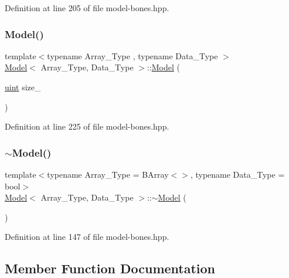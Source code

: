 Definition at line 205 of file model-\/bones.\+hpp.

\mbox{\label{class_model_a841a883c666ecd9b07385bfb36078bc5}} 
\subsubsection{\texorpdfstring{Model()}{Model()}\hspace{0.1cm}{\footnotesize\ttfamily [2/2]}}
{\footnotesize\ttfamily template$<$typename Array\+\_\+\+Type , typename Data\+\_\+\+Type $>$ \\
\hyperlink{class_model}{Model}$<$ Array\+\_\+\+Type, Data\+\_\+\+Type $>$\+::\hyperlink{class_model}{Model} (\begin{DoxyParamCaption}\item[{\hyperlink{typedefs_8hpp_a91ad9478d81a7aaf2593e8d9c3d06a14}{uint}}]{size\+\_\+ }\end{DoxyParamCaption})\hspace{0.3cm}{\ttfamily [inline]}}



Definition at line 225 of file model-\/bones.\+hpp.

\mbox{\label{class_model_aaed0a5937479c213e620bf8095ddea5d}} 
\subsubsection{\texorpdfstring{$\sim$\+Model()}{~Model()}}
{\footnotesize\ttfamily template$<$typename Array\+\_\+\+Type  = B\+Array$<$$>$, typename Data\+\_\+\+Type  = bool$>$ \\
\hyperlink{class_model}{Model}$<$ Array\+\_\+\+Type, Data\+\_\+\+Type $>$\+::$\sim$\hyperlink{class_model}{Model} (\begin{DoxyParamCaption}{ }\end{DoxyParamCaption})\hspace{0.3cm}{\ttfamily [inline]}}



Definition at line 147 of file model-\/bones.\+hpp.



\subsection{Member Function Documentation}
\mbox{\label{class_model_a28ad7090cb5b3f3be9e24d9aef15ce75}} 
